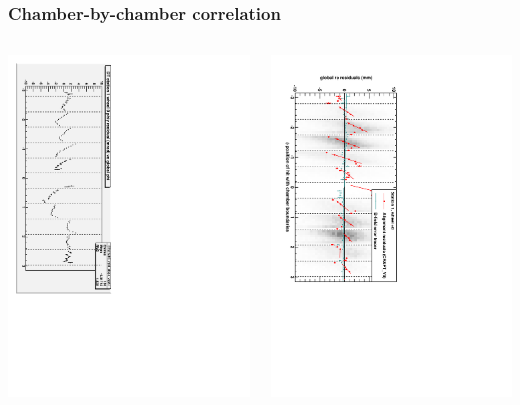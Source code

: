 \documentclass[compress]{beamer}
\begin{document}
\begin{frame}
\frametitle{Chamber-by-chamber correlation}

\begin{columns}
\includegraphics[height=\linewidth, angle=90]{possible_acoplanarity.pdf}

\includegraphics[height=\linewidth, angle=90]{DTrphiVsPhi_st1_whC.pdf}


\end{columns}
\end{frame}
\end{document}
